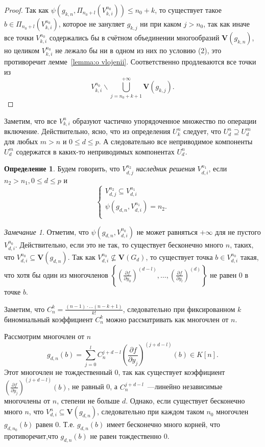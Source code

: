 \documentclass[16pt]{article}
\renewcommand{\le}{\leqslant} %
\theoremstyle{plain1}
\theoremstyle{plain2}
\theoremstyle{plain}
\theoremstyle{plain3}
\theoremstyle{definition}
\newtheorem{definition}[theorem2]{Определение}
\theoremstyle{remark}
\newtheorem{remark}[theorem1]{Замечание}
\begin{document}
\begin{proof}
 Так как $\psi(g_{k,n},\Pi_{n_0+l}({V}_{k,i}^{n_0}))\le n_0+k$, то существует такое $b\in \Pi_{n_0+l}({V}_{k,i}^{n_0})$,  которое не зануляет $g_{k,j}$ ни при каком $j>n_0$, так как иначе все точки ${V}_{k,i}^{n_0}$ содержались бы в счётном объединении многообразий $\mathbf{V}(g_{k,n})$, но целиком ${V}_{k,i}^{n_0}$ не лежало бы ни в одном из них по условию (2), это противоречит лемме~\ref{lemma:o vlojenii}. Соответственно продлеваются все точки из $${V}_{k,i}^{n_0}\backslash \bigcup\limits_{j=n_0+k+1}^{+\infty}\mathbf{V}(g_{k,j}).$$
 \end{proof}


Заметим, что все ${V}_{k,i}^n$ образуют частично упорядоченное множество по операции включение. Действительно, ясно, что из определения ${U}_{k}^n$ следует, что  ${U}_{d}^n\supseteq {U}_{d}^m$ для любых $m >n$ и $0\le d\le p$. А следовательно
все неприводимое компоненты ${U}_{d}^m$ содержатся в каких-то неприводимых компонентах ${U}_{d}^n$.



\begin{definition}
Будем говорить, что ${V}_{d,j}^{n_2}$ \emph{наследник решения} ${V}_{d,i}^{n_1}$, если $n_2>n_1, 0\le d\le p$ и
$$
\left\{
 \begin{aligned}
 {V}_{d,j}^{n_2}\subseteq {V}_{d,i}^{n_1}\\
 \psi(g_{d,n},{V}_{d,i}^{n_1})=n_2.\\
 \end{aligned}
 \right.
$$
\end{definition}

\begin{remark}\label{remark:o_konechnosti_psi}
Отметим, что $\psi(g_{d,n},{V}_{d,i}^{n_0})$ не может равняться $+\infty$  для не пустого ${V}_{d,i}^{n_0}$. Действительно, если это не так, то существует бесконечно много $n$, таких, что ${V}_{d,i}^{n_0}\subseteq \mathbf{V}(g_{d,n})$. Так как ${V}_{d,i}^{n_0} \not\subseteq \mathbf{V}(G_d)$, то существует точка $b\in {V}_{d,i}^{n_0}$ такая, что хотя бы один из многочленов $\left\{\left(\frac{\partial f}{\partial y_0}\right)^{(d-l)},\ldots, \left(\frac{\partial f}{\partial y_l}\right)^{(d)} \right\}$ не равен 0 в точке $b$.

Заметим, что $C_n^k=\frac{(n-1)\cdot\ldots(n-k+1)}{k!}$, следовательно при фиксированном $k$ биномиальный коэффициент $C_n^k$ можно рассматривать как многочлен от $n$.

Рассмотрим многочлен от $n$
$$
g_{d,n}(b)=\sum\limits_{j=0}^{l}C_n^{j+d - l }\left(\frac{\partial f}{\partial y_j}\right)^{(j+d - l)}(b)\in K[n].
$$
Этот многочлен не тождественный 0, так как существует коэффициент $\left(\frac{\partial f}{\partial y_j}\right)^{(j+d - l)}(b)$, не равный 0, а $C_n^{j+d - l }$~---линейно независимые многочлены от $n$, степени не больше $d$. Однако, если существует бесконечно много $n$, что ${V}_{d,i}^n\subseteq \mathbf{V}(g_{d,n})$, следовательно при каждом таком $n_0$ многочлен $g_{d,n_0}(b)$ равен 0. Т.е. $g_{d,n}(b)$ имеет бесконечно много корней, что противоречит,что $g_{d,n}(b)$ не равен тождественно 0.
\end{remark}
\end{document}
